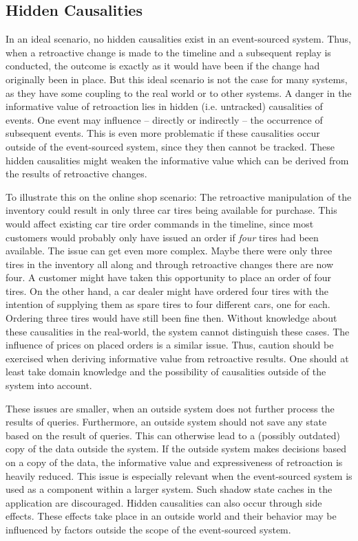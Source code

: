 \subsection{Hidden Causalities}
\label{sec:hidden}
In an ideal scenario, no hidden causalities exist in an event-sourced system. 
Thus, when a retroactive change is made to the timeline and a subsequent replay 
is conducted, the outcome is exactly as it would have been if the change had 
originally been in place.
But this ideal scenario is not the case for many systems, as they have some 
coupling to the real world or to other systems.
A danger in the informative value of retroaction lies in hidden (i.e.  untracked) 
causalities of events. 
One event may influence -- directly or indirectly -- the occurrence of subsequent 
events. This is even more problematic if these causalities occur outside of the 
event-sourced system, since they then cannot be tracked.
%
These hidden causalities might weaken the informative value which can be derived 
from the results of retroactive changes. 

To illustrate this on the online shop scenario: The retroactive manipulation of 
the inventory could result in only three car tires being available for purchase. 
This would affect existing car tire order commands in the timeline, since most 
customers would probably only have issued an order if \emph{four} tires had been 
available.
The issue can get even more complex. Maybe there were only three tires in
the inventory all along and through retroactive changes there are now four.
A customer might have taken this opportunity to place an order of four tires. 
On the other hand, a car dealer might have ordered four tires with the
intention of supplying them as spare tires to four different cars, one for each. 
Ordering three tires would have still been fine then. Without knowledge about 
these causalities in the real-world, the system cannot distinguish these cases.
The influence of prices on placed orders is a similar issue.
Thus, caution should be exercised when deriving informative value from 
retroactive results. One should at least take domain knowledge and the
possibility of causalities outside of the system into account. 

These issues are smaller, when an outside system does not further process the 
results of queries. Furthermore, an outside system should not save any state 
based on the result of queries. This can otherwise lead to a (possibly outdated) 
copy of the data outside the system. 
If the outside system makes decisions based on a copy of the data, the 
informative value and expressiveness of retroaction is heavily reduced. This 
issue is especially relevant when the event-sourced system is used as a 
component within a larger system. Such shadow state caches in the application 
are discouraged. 
Hidden causalities can also occur through side effects. These effects take 
place in an outside world and their behavior may be influenced by factors 
outside the scope of the event-sourced system.

